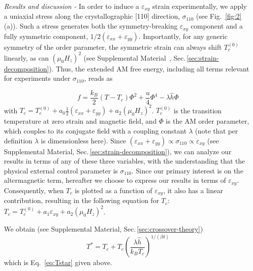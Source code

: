 \documentclass[
 reprint,










 amsmath,amssymb,
 aps,






]{revtex4-2}
\begin{document}
\textit{Results and discussion - } In order to induce a $\varepsilon_{xy}$ strain experimentally, we apply a uniaxial stress along the crystallographic [110] direction, $\sigma_{110}$ (see Fig.~\ref{fig:2}\,(a)). Such a stress generates both the symmetry-breaking $\varepsilon_{xy}$ component and a fully symmetric component, $1/2\left(\varepsilon_{xx}+\varepsilon_{yy}\right)$. Importantly, for any generic symmetry of the order parameter, the symmetric strain can always shift $T_c^{(0)}$ linearly, as can $(\mu_0 H_z)^2$ (see Supplemental Material~\cite{SI26}\nocite{Boo76,Ike78,Torrent2008Apr,Marques2012Oct,Gonze2016Aug,Gonze2020Mar,Romero2020Mar,Jollet2014Apr,Amadon2008,Verstraete2001,Noa23,Jerzembeck22,Mel70,Ike19,Sto11,Straquadine20,Jerzembeck24,Har72}, Sec.\,\ref{sec:strain-decomposition}). Thus, the extended AM free energy, including all terms relevant for experiments under $\sigma_{110}$, reads as~\cite{Steward23,Steward25,Chakarborty2025}

\begin{equation}
f=\frac{k_{B}}{2}\left(T-T_c\right)\Phi^{2}+\frac{u}{4}\Phi^{4}-\lambda\hat{h}\Phi
     \label{eq:free-energy-expanded}
\end{equation}
with $T_{c}=T_c^{(0)}+a_0 \frac{1}{2}(\varepsilon_{xx}+\varepsilon_{yy})+a_2 (\mu_0H_z)^2$.
$T_{c}^{\left(0\right)}$ is the transition temperature at zero strain and magnetic field, and $\Phi$ is the AM order parameter, which couples to its conjugate field with a coupling constant $\lambda$ (note that per definition $\lambda$ is dimensionless here).
Since $(\varepsilon_{xx}+\varepsilon_{yy})  \propto \sigma_{110}  \propto \varepsilon_{xy}$ (see Supplemental Material, Sec.\,\ref{sec:strain-decomposition}), we can analyze our results in terms of any of these three variables, with the understanding that the physical external control parameter is $\sigma_{110}$. Since our primary interest is on the altermagnetic term, hereafter we choose to express our results in terms of $\varepsilon_{xy}$. Consequently, when $T_c$ is plotted as a function of $\varepsilon_{xy}$, it also has a linear contribution, resulting in the following equation for $T_c$: $T_{c}=T_{c}^{\left(0\right)}+a_{1}\varepsilon_{xy}+a_{2}(\mu_{0}H_{z})^{2}$.

We obtain (see Supplemental Material, Sec.\,\ref{sec:crossover-theory})
\begin{equation}
    T^{*}=T_{c}+T_{c}\left(\frac{\lambda\hat{h}}{k_B T_{c}}\right)^{1/(\beta\delta)}
    \label{eq:crossover-expanded}
\end{equation}
which is Eq.~\eqref{eq:Tstar} given above.
\end{document}
